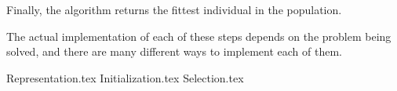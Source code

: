   Finally, the algorithm returns the fittest individual in the population.

  The actual implementation of each of these steps depends on the problem being solved, and there
  are many different ways to implement each of them.

  {Representation.tex}
  {Initialization.tex}
  {Selection.tex}
